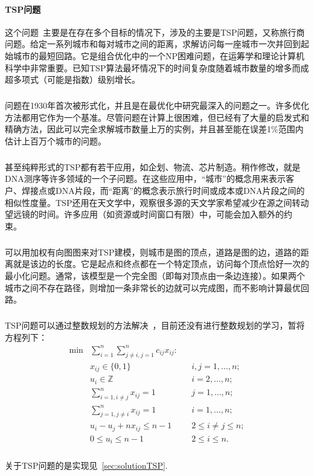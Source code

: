 \documentclass[UTF8,a4paper]{ctexart}
\begin{document}
\paragraph{TSP问题}这个问题~\cite{tsptheory}主要是在存在多个目标的情况下，涉及的主要是TSP问题，又称旅行商问题。给定一系列城市和每对城市之间的距离，求解访问每一座城市一次并回到起始城市的最短回路。它是组合优化中的一个NP困难问题，在运筹学和理论计算机科学中非常重要。已知TSP算法最坏情况下的时间复杂度随着城市数量的增多而成超多项式（可能是指数）级别增长。
\subparagraph{}问题在1930年首次被形式化，并且是在最优化中研究最深入的问题之一。许多优化方法都用它作为一个基准。尽管问题在计算上很困难，但已经有了大量的启发式和精确方法，因此可以完全求解城市数量上万的实例，并且甚至能在误差1\%范围内估计上百万个城市的问题。
\subparagraph{}甚至纯粹形式的TSP都有若干应用，如企划、物流、芯片制造。稍作修改，就是DNA测序等许多领域的一个子问题。在这些应用中，“城市”的概念用来表示客户、焊接点或DNA片段，而“距离”的概念表示旅行时间或成本或DNA片段之间的相似性度量。TSP还用在天文学中，观察很多源的天文学家希望减少在源之间转动望远镜的时间。许多应用（如资源或时间窗口有限）中，可能会加入额外的约束。~\cite{worldtsp}
\subparagraph{}可以用加权有向图图来对TSP建模，则城市是图的顶点，道路是图的边，道路的距离就是该边的长度。它是起点和终点都在一个特定顶点，访问每个顶点恰好一次的最小化问题。通常，该模型是一个完全图（即每对顶点由一条边连接）。如果两个城市之间不存在路径，则增加一条非常长的边就可以完成图，而不影响计算最优回路。
\subparagraph{}TSP问题可以通过整数规划的方法解决~\cite{papadimi}，目前还没有进行整数规划的学习，暂将方程列下：
\begin{align*}
    \min & \sum _{i=1}^{n}\sum _{j\neq i,j=1}^{n}c_{ij}x_{ij}\colon &  &                      \\
         & x_{ij}\in \{0,1\}                                        &  & i,j=1,\ldots ,n;     \\
         & u_{i}\in  \mathbb{Z}                                     &  & i=2,\ldots ,n;       \\
         & \sum _{i=1,i\neq j}^{n}x_{ij}=1                          &  & j=1,\ldots ,n;       \\
         & \sum _{j=1,j\neq i}^{n}x_{ij}=1                          &  & i=1,\ldots ,n;       \\
         & u_{i}-u_{j}+nx_{ij}\leq n-1                              &  & 2\leq i\neq j\leq n; \\
         & 0\leq u_{i}\leq n-1                                      &  & 2\leq i\leq n.
\end{align*}
\subparagraph{}关于TSP问题的是实现见~\ref{sec:solutionTSP}.
\end{document}
